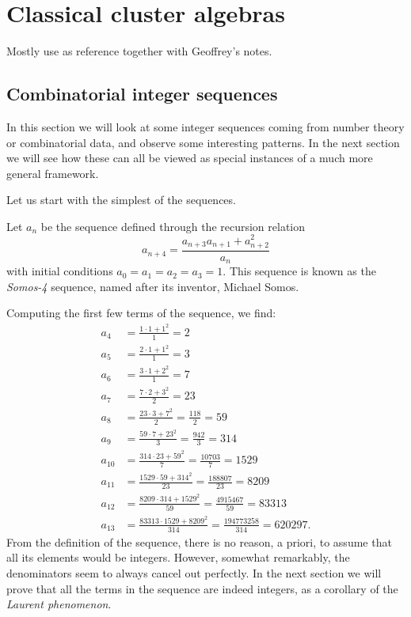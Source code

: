 \chapter{Classical cluster algebras}
Mostly use \cite{FominWilliams2021IntroductionCA_1-3} as reference together with
Geoffrey's notes.

\section{Combinatorial integer sequences}

In this section we will look at some integer sequences coming from number theory or
combinatorial data, and observe some interesting patterns. In the next section we will
see how these can all be viewed as special instances of a much more general framework.

Let us start with the simplest of the sequences.
\begin{definition}
	Let $a_n$ be the sequence defined through the recursion relation
	\begin{equation}
		\label{eq:somos_4}
		a_{n+4} = \frac{a_{n+3}a_{n+1}+ a_{n+2}^2}{a_n}
	\end{equation}
	with initial conditions $a_0 = a_1 = a_2 = a_3 = 1$. This sequence is known as the \emph{Somos-4} sequence, named after its inventor, Michael Somos.
\end{definition}
Computing the first few terms of the sequence, we find:
\begin{align*}
	a_4    & = \frac{1 \cdot 1 + 1^2}{1} = 2                                           \\
	a_5    & = \frac{2 \cdot 1 + 1^2}{1} = 3                                           \\
	a_6    & = \frac{3 \cdot 1 + 2^2}{1} = 7                                           \\
	a_7    & = \frac{7 \cdot 2 + 3^2}{2} = 23                                          \\
	a_8    & = \frac{23 \cdot 3 + 7^2}{2} = \frac{118}{2} = 59                         \\
	a_9    & = \frac{59 \cdot 7 + 23^2}{3} = \frac{942}{3} = 314                       \\
	a_{10} & = \frac{314 \cdot 23 + 59^2}{7} = \frac{10703}{7} = 1529                  \\
	a_{11} & = \frac{1529 \cdot 59 + 314^2}{23} = \frac{188807}{23} = 8209             \\
	a_{12} & = \frac{8209 \cdot 314 + 1529^2}{59} = \frac{4915467}{59} = 83313         \\
	a_{13} & = \frac{83313 \cdot 1529 + 8209^2}{314} = \frac{194773258}{314} = 620297.
\end{align*}
From the definition of the sequence, there is no reason, a priori, to assume that all its elements would be integers. However, somewhat remarkably, the denominators seem to always cancel out perfectly. In the next section we will prove that all the terms in the sequence are indeed integers,
as a corollary of the \emph{Laurent phenomenon}.

